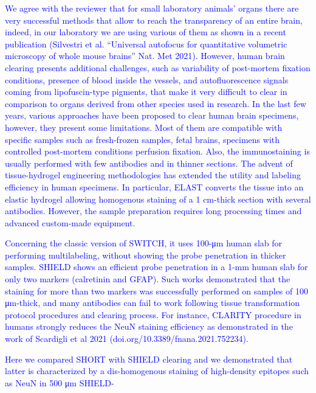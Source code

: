\documentclass{article}
\newcommand{\reply}[1]{\textcolor{blue}{#1}}
\begin{document}
\noindent \reply{We agree with the reviewer that for small laboratory animals’ organs there are very successful} \reply{methods that allow to reach the transparency of an entire brain, indeed, in our laboratory we are} \reply{using various of them as shown in a recent publication (Silvestri et al. “Universal autofocus for} \reply{quantitative volumetric microscopy of whole mouse brains” Nat. Met 2021). However, human brain} \reply{clearing presents additional challenges, such as variability of post-mortem fixation conditions,} \reply{presence of blood inside the vessels, and autofluorescence signals coming from lipofuscin-type} \reply{pigments, that make it very difficult to clear in comparison to organs derived from other species} \reply{used in research. In the last few years, various approaches have been proposed to clear human} \reply{brain specimens, however, they} \reply{present some limitations. Most of them are compatible with} \reply{specific samples such as fresh-frozen samples, fetal brains, specimens with controlled post-}\reply{mortem conditions perfusion fixation. Also, the immunostaining is usually performed with few} \reply{antibodies and in thinner sections. The advent of tissue-hydrogel engineering methodologies has} \reply{extended the utility and labeling efficiency in human specimens. In particular, ELAST converts the} \reply{tissue into an elastic hydrogel allowing homogenous staining of a 1 cm-thick section with several} \reply{antibodies. However, the sample preparation requires long processing times and advanced} \reply{custom-made equipment.}

\noindent \reply{Concerning the classic version of SWITCH, it uses 100-μm human slab for performing} \reply{multilabeling, without showing the probe penetration in thicker samples. SHIELD shows an efficient} \reply{probe penetration in a 1-mm human slab for only two markers (calretinin and GFAP). Such works} \reply{demonstrated that the staining for more than two markers was successfully performed on samples} \reply{of 100 μm-thick, and many antibodies can fail to work following tissue transformation protocol} \reply{procedures and clearing process. For instance, CLARITY procedure in humans strongly reduces} \reply{the NeuN staining efficiency as demonstrated in the work of Scardigli et al 2021} \reply{(doi.org/10.3389/fnana.2021.752234).}

\noindent \reply{Here we compared SHORT with SHIELD clearing and we demonstrated that latter is characterized} \reply{by a dis-homogenous staining of high-density epitopes such as NeuN in 500 μm SHIELD-}
\end{document}
